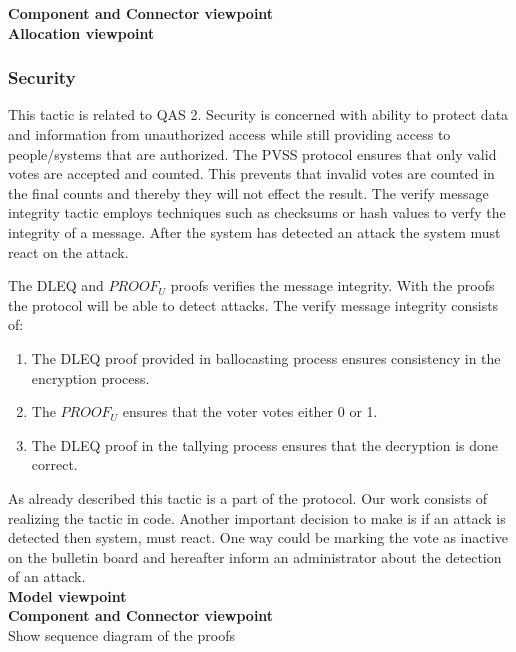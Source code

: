 \noindent
\textbf{Component and Connector viewpoint}\\

\noindent
\textbf{Allocation viewpoint}\\


\noindent
\subsubsection{Security}
This tactic is related to QAS 2. Security is concerned with ability to protect data and information from unauthorized access while still providing access to people/systems that are authorized. The PVSS protocol ensures that only valid votes are accepted and counted. This prevents that invalid votes are counted in the final counts and thereby they will not effect the result. The verify message integrity tactic employs techniques such as checksums or hash values to verfy the integrity of a message. After the system has detected an attack the system must react on the attack.

\begin{center}
\end{center}
The DLEQ and $PROOF_U$ proofs verifies the message integrity. With the proofs the protocol will be able to detect attacks. The verify message integrity consists of:

\begin{enumerate}
    \item The DLEQ proof provided in ballocasting process ensures consistency in the encryption process.
    \item  The $PROOF_U$ ensures that the voter votes either 0 or 1.
    \item  The DLEQ proof in the tallying process ensures that the decryption is done correct.
\end{enumerate}

\noindent
As already described this tactic is a part of the protocol. Our work consists of realizing the tactic in code. Another important decision to make is if an attack is detected then system, must react. One way could be marking the vote as inactive on the bulletin board and hereafter inform an administrator about the detection of an attack.\\   

\noindent
\textbf{Model viewpoint}\\


\noindent
\textbf{Component and Connector viewpoint}\\
Show sequence diagram of the proofs\\

